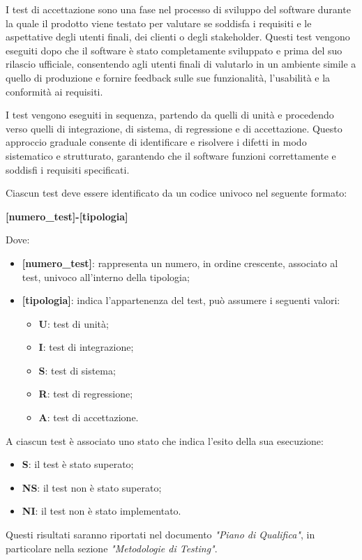 I test di accettazione sono una fase nel processo di sviluppo del software durante la quale il prodotto viene testato per valutare se soddisfa i requisiti e le aspettative degli utenti finali, dei clienti o degli stakeholder. Questi test vengono eseguiti dopo che il software è stato completamente sviluppato e prima del suo rilascio ufficiale, consentendo agli utenti finali di valutarlo in un ambiente simile a quello di produzione e fornire feedback sulle sue funzionalità, l'usabilità e la conformità ai requisiti.

I test vengono eseguiti in sequenza, partendo da quelli di unità e procedendo verso quelli di integrazione, di sistema, di regressione e di accettazione. Questo approccio graduale consente di identificare e risolvere i difetti in modo sistematico e strutturato, garantendo che il software funzioni correttamente e soddisfi i requisiti specificati.

Ciascun test deve essere identificato da un codice univoco nel seguente formato:
\begin{center}
	\textbf{[numero\_test]-[tipologia]}
\end{center}
Dove:
\begin{itemize}
	\item \textbf{[numero\_test]}: rappresenta un numero, in ordine crescente, associato al test, univoco all'interno della tipologia;
	\item \textbf{[tipologia]}: indica l'appartenenza del test, può assumere i seguenti valori:
	      \begin{itemize}
		      \item \textbf{U}: test di unità;
		      \item \textbf{I}: test di integrazione;
		      \item \textbf{S}: test di sistema;
		      \item \textbf{R}: test di regressione;
		      \item \textbf{A}: test di accettazione.
	      \end{itemize}

\end{itemize}

A ciascun test è associato uno stato che indica l'esito della sua esecuzione:
\begin{itemize}
	\item \textbf{S}: il test è stato superato;
	\item \textbf{NS}: il test non è stato superato;
	\item \textbf{NI}: il test non è stato implementato.
\end{itemize}
Questi risultati saranno riportati nel documento \textit{"Piano di Qualifica"}, in particolare nella sezione \textit{"Metodologie di Testing"}.

